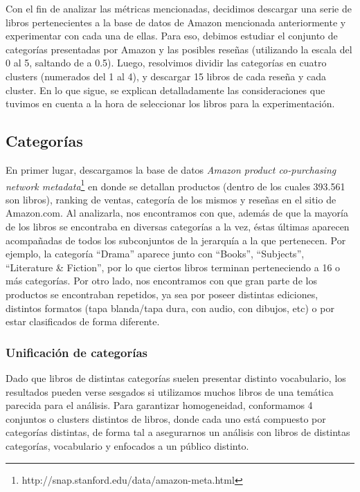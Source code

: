 \documentclass[12pt,journal,compsoc]{IEEEtran}
\begin{document}
Con el fin de analizar las métricas mencionadas, decidimos descargar una serie de libros pertenecientes a la base de datos de Amazon mencionada anteriormente y experimentar con cada una de ellas. Para eso, debimos estudiar el conjunto de categorías presentadas por Amazon y las posibles reseñas (utilizando la escala del 0 al 5, saltando de a 0.5). Luego, resolvimos dividir las categorías en cuatro clusters (numerados del 1 al 4), y descargar 15 libros de cada reseña y cada cluster. En lo que sigue, se explican detalladamente las consideraciones que tuvimos en cuenta a la hora de seleccionar los libros para la experimentación.

\subsection{Categorías}

En primer lugar, descargamos la base de datos \textit{Amazon product co-purchasing network metadata}\footnote{http://snap.stanford.edu/data/amazon-meta.html} en donde se detallan productos (dentro de los cuales 393.561 son libros), ranking de ventas, categoría de los mismos y reseñas en el sitio de Amazon.com. Al analizarla, nos encontramos con que, además de que la mayoría de los libros se encontraba en diversas categorías a la vez, éstas últimas aparecen acompañadas de todos los subconjuntos de la jerarquía a la que pertenecen. Por ejemplo, la categoría ``Drama'' aparece junto con ``Books'', ``Subjects'', ``Literature \& Fiction'', por lo que ciertos libros terminan perteneciendo a 16 o más categorías. Por otro lado, nos encontramos con que gran parte de los productos se encontraban repetidos, ya sea por poseer distintas ediciones, distintos formatos (tapa blanda/tapa dura, con audio, con dibujos, etc) o por estar clasificados de forma diferente. 

\subsubsection{Unificación de categorías}

Dado que libros de distintas categorías suelen presentar distinto vocabulario, los resultados pueden verse sesgados si utilizamos muchos libros de una temática parecida para el análisis. Para garantizar homogeneidad, conformamos 4 conjuntos o clusters distintos de libros, donde cada uno está compuesto por categorías distintas, de forma tal a asegurarnos un análisis con libros de distintas categorías, vocabulario y enfocados a un público distinto.
\end{document}
